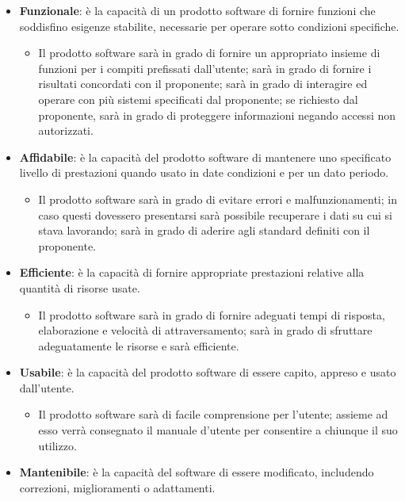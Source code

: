 \documentclass[../piano_di_qualifica.tex]{subfiles}
\begin{document}
\begin{itemize}
	\item \textbf{Funzionale}: è la capacità di un prodotto software di fornire funzioni che soddisfino esigenze stabilite, necessarie per operare sotto condizioni specifiche.
	      \begin{itemize}
		      \item Il prodotto software sarà in grado di fornire un appropriato insieme di funzioni per i compiti prefissati dall’utente; sarà in grado di fornire i risultati concordati con il proponente; sarà in grado di interagire ed operare con più sistemi specificati dal proponente; se richiesto dal proponente, sarà in grado di proteggere informazioni negando accessi non autorizzati.
	      \end{itemize}
	\item \textbf{Affidabile}: è la capacità del prodotto software di mantenere uno specificato livello di prestazioni quando usato in date condizioni e per un dato periodo.
	      \begin{itemize}
		      \item Il prodotto software sarà in grado di evitare errori e malfunzionamenti; in caso questi dovessero presentarsi sarà possibile recuperare i dati su cui si stava lavorando; sarà in grado di aderire agli standard definiti con il proponente.
	      \end{itemize}
	\item \textbf{Efficiente}: è la capacità di fornire appropriate prestazioni relative alla quantità di risorse usate.
	      \begin{itemize}
		      \item Il prodotto software sarà in grado di fornire adeguati tempi di risposta, elaborazione e velocità di attraversamento; sarà in grado di sfruttare adeguatamente le risorse e sarà efficiente.
	      \end{itemize}
	\item \textbf{Usabile}: è la capacità del prodotto software di essere capito, appreso e usato dall'utente.
	      \begin{itemize}
		      \item Il prodotto software sarà di facile comprensione per l’utente; assieme ad esso verrà consegnato il manuale d’utente per consentire a chiunque il suo utilizzo.
	      \end{itemize}
	\item \textbf{Mantenibile}: è la capacità del software di essere modificato, includendo correzioni, miglioramenti o adattamenti.

\end{itemize}
\end{document}
